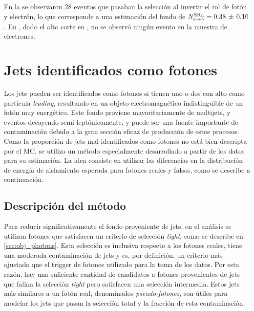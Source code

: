 En la {\SRL} se observaron 28 eventos que pasaban la selección al invertir el
rol de fotón y electrón, lo que corresponde a una estimación del fondo de
$N^{\mathrm{SR}_\mathrm{L}}_{e\rightarrow\gamma} = 0.38\, \pm\, 0.10$. En {\SRH}, dado el alto corte en
{\met}, no se observó ningún evento en la muestra de electrones.



\section{Jets identificados como fotones}
\label{sec:jfakes}

Los jets pueden ser identificados como fotones si tienen uno o dos {\pizero} con
alto {\pt} como partícula \emph{leading}, resultando en un objeto
electromagnético indistinguible de un fotón muy energético. Este fondo
proviene mayoritariamente de multijets, {\wjets} y eventos {\ttbar} decayendo
semi-leptónicamente, y puede ser una fuente importante de contaminación debido a
la gran sección eficaz de producción de estos procesos. Como la proporción de
jets mal identificados como fotones no está bien descripta por el MC, se
utiliza un método especialmente desarrollado a partir de los datos para su estimación.
La idea consiste en utilizar las diferencias en la distribución de energía de aislamiento
esperada para fotones reales y falsos, como se describe a continuación.

\subsection{Descripción del método}

Para reducir significativamente el fondo proveniente de jets, en el análisis se
utilizan fotones que satisfacen un criterio de selección \emph{tight}, como se
describe en \cref{sec:obj_photons}. Esta selección es inclusiva respecto a los
fotones reales, tiene una moderada contaminación de jets y es, por definición,
un criterio más ajustado que el trigger de fotones utilizado para la toma de los
datos. Por esta razón, hay una suficiente cantidad de candidatos a fotones
provenientes de jets que fallan la selección \emph{tight} pero satisfacen una
selección intermedia. Estos jets más similares a un fotón real, denominados
\emph{pseudo-fotones}, son útiles para modelar los jets que pasan la selección
total y la fracción de esta contaminación.


